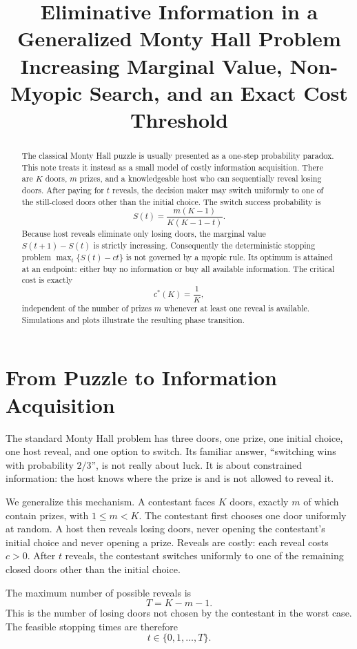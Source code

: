 \documentclass[11pt]{article}
\title{\textbf{Eliminative Information in a Generalized Monty Hall Problem}\\
\large Increasing Marginal Value, Non-Myopic Search, and an Exact Cost Threshold}
\author{}
\date{}
\newcommand{\Tmax}{T}
\begin{document}
\maketitle

\begin{abstract}
The classical Monty Hall puzzle is usually presented as a one-step
probability paradox.  This note treats it instead as a small model of costly
information acquisition.  There are $K$ doors, $m$ prizes, and a knowledgeable
host who can sequentially reveal losing doors.  After paying for $t$ reveals,
the decision maker may switch uniformly to one of the still-closed doors
other than the initial choice.  The switch success probability is
\[
  S(t)=\frac{m(K-1)}{K(K-1-t)}.
\]
Because host reveals eliminate only losing doors, the marginal value
$S(t+1)-S(t)$ is strictly increasing.  Consequently the deterministic
stopping problem $\max_t\{S(t)-ct\}$ is not governed by a myopic rule.  Its
optimum is attained at an endpoint: either buy no information or buy all
available information.  The critical cost is exactly
\[
  c^*(K)=\frac1K,
\]
independent of the number of prizes $m$ whenever at least one reveal is
available.  Simulations and plots illustrate the resulting phase transition.
\end{abstract}

\section{From Puzzle to Information Acquisition}

The standard Monty Hall problem has three doors, one prize, one initial
choice, one host reveal, and one option to switch.  Its familiar answer,
``switching wins with probability $2/3$'', is not really about luck.  It is
about constrained information: the host knows where the prize is and is not
allowed to reveal it.

We generalize this mechanism.  A contestant faces $K$ doors, exactly $m$ of
which contain prizes, with $1\le m<K$.  The contestant first chooses one door
uniformly at random.  A host then reveals losing doors, never opening the
contestant's initial choice and never opening a prize.  Reveals are costly:
each reveal costs $c>0$.  After $t$ reveals, the contestant switches uniformly
to one of the remaining closed doors other than the initial choice.

The maximum number of possible reveals is
\[
  \Tmax=K-m-1.
\]
This is the number of losing doors not chosen by the contestant in the worst
case.  The feasible stopping times are therefore
\[
  t\in\{0,1,\dots,\Tmax\}.
\]
\end{document}
